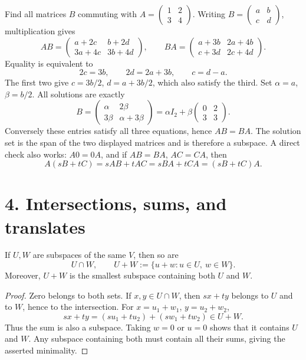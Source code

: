 \begin{example}\label{example:02:commuting}
Find all matrices \(B\) commuting with
\(A=\begin{pmatrix}1&2\\3&4\end{pmatrix}\).
Writing \(B=\begin{pmatrix}a&b\\c&d\end{pmatrix}\), multiplication gives
\[
AB=\begin{pmatrix}a+2c&b+2d\\3a+4c&3b+4d\end{pmatrix},\qquad
BA=\begin{pmatrix}a+3b&2a+4b\\c+3d&2c+4d\end{pmatrix}.
\]
Equality is equivalent to
\[
2c=3b,\qquad 2d=2a+3b,\qquad c=d-a.
\]
The first two give \(c=3b/2\), \(d=a+3b/2\), which also satisfy the
third. Set \(\alpha=a\), \(\beta=b/2\). All solutions are exactly
\[
B=\begin{pmatrix}\alpha&2\beta\\3\beta&\alpha+3\beta\end{pmatrix}
=\alpha I_2+\beta\begin{pmatrix}0&2\\3&3\end{pmatrix}.
\]
Conversely these entries satisfy all three equations, hence \(AB=BA\).
The solution set is the span of the two displayed matrices and is
therefore a subspace. A direct check also works: \(A0=0A\), and if \(AB=BA\), \(AC=CA\), then
\[
A(sB+tC)=sAB+tAC=sBA+tCA=(sB+tC)A.
\]
\end{example}

\section*{4. Intersections, sums, and translates}

\begin{proposition}\label{prop:02:sum-intersection}
If \(U,W\) are subspaces of the same \(V\), then so are
\[
U\cap W,\qquad U+W:=\{u+w:u\in U,\ w\in W\}.
\]
Moreover, \(U+W\) is the smallest subspace containing both \(U\) and \(W\).
\end{proposition}
\begin{proof}
Zero belongs to both sets. If \(x,y\in U\cap W\), then \(sx+ty\)
belongs to \(U\) and to \(W\), hence to the intersection.
For \(x=u_1+w_1\), \(y=u_2+w_2\),
\[
sx+ty=(su_1+tu_2)+(sw_1+tw_2)\in U+W.
\]
Thus the sum is also a subspace. Taking \(w=0\) or \(u=0\) shows that
it contains \(U\) and \(W\). Any subspace containing both must contain
all their sums, giving the asserted minimality.
\end{proof}


